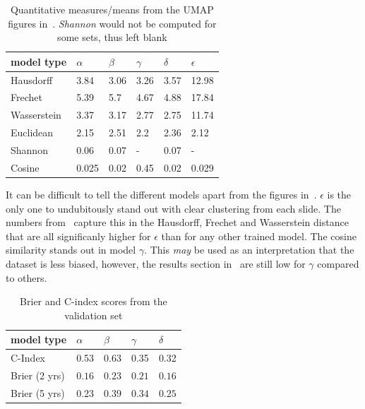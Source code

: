 \documentclass[10pt,twocolumn,letterpaper]{article}
\begin{document}
\begin{table}
\centering
  \begin{tabular}{|l l l l l l|}
    \hline 
    model type & $\alpha$ & $\beta$ & $\gamma$ & $\delta$ & $\epsilon$ \\
    \hline 
    Hausdorff & 3.84 & 3.06 & 3.26 & 3.57 & 12.98 \\
    Frechet & 5.39 & 5.7 & 4.67 & 4.88 & 17.84 \\
    Wasserstein & 3.37 & 3.17 & 2.77 & 2.75 & 11.74 \\
    \hline
    Euclidean & 2.15 & 2.51 & 2.2  & 2.36 & 2.12  \\
    Shannon & 0.06 & 0.07 & - & 0.07 & - \\
    Cosine & 0.025 & 0.02 & 0.45 & 0.02 & 0.029  \\
    \hline
  \end{tabular}
  \caption{Quantitative measures/means from the \gls{UMAP} figures in~. \textit{Shannon} would not be computed for some sets, thus left blank}
  \label{tab:quantitativeres}
\end{table}

It can be difficult to tell the different models apart from the figures in~. $\epsilon$ is the only one to undubitously stand out with clear clustering from each slide. The numbers from~ capture this in the Hausdorff, Frechet and Wasserstein distance that are all significanly higher for $\epsilon$ than for any other trained model. The cosine similarity stands out in model $\gamma$. This \textit{may} be used as an interpretation that the dataset is less biased, however, the results section in~ are still low for $\gamma$ compared to others. 


\begin{table}
\centering
  \begin{tabular}{l l l l l}
    model type & $\alpha$ & $\beta$ & $\gamma$ & $\delta$ \\
    \hline
    C-Index & 0.53 & 0.63 & 0.35 & 0.32 \\
    Brier (2 yrs) & $0.16$ & $0.23$ & $0.21$ & $0.16$  \\
    Brier (5 yrs) & $0.23$ & $0.39$ & $0.34$ & $0.25$  \\
    \hline
  \end{tabular}
  \caption{Brier and C-index scores from the validation set}
  \label{tab:combinedres}
\end{table}
\end{document}
